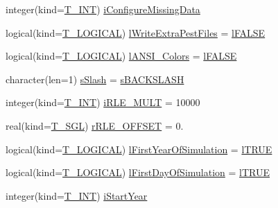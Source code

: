 \begin{DoxyCompactItemize}
\item 
integer(kind=\hyperlink{namespacetypes_a4e4d040a4425196c4d43be63e7e6103a}{T\_\-INT}) \hyperlink{typetypes_1_1_t___m_o_d_e_l___c_o_n_f_i_g_u_r_a_t_i_o_n_a1d05af921e3ca39179370f17f3836143}{iConfigureMissingData}
\item 
logical(kind=\hyperlink{namespacetypes_adfa8f4f6096bb7bdbb93f36b911dcaad}{T\_\-LOGICAL}) \hyperlink{typetypes_1_1_t___m_o_d_e_l___c_o_n_f_i_g_u_r_a_t_i_o_n_a213657df8f8f480677cb2fd9b803f51f}{lWriteExtraPestFiles} = \hyperlink{namespacetypes_ad09a27b431e0fad201524039e6943e5b}{lFALSE}
\item 
logical(kind=\hyperlink{namespacetypes_adfa8f4f6096bb7bdbb93f36b911dcaad}{T\_\-LOGICAL}) \hyperlink{typetypes_1_1_t___m_o_d_e_l___c_o_n_f_i_g_u_r_a_t_i_o_n_af2275fb1449a5289ec011bd40950abd4}{lANSI\_\-Colors} = \hyperlink{namespacetypes_ad09a27b431e0fad201524039e6943e5b}{lFALSE}
\item 
character(len=1) \hyperlink{typetypes_1_1_t___m_o_d_e_l___c_o_n_f_i_g_u_r_a_t_i_o_n_a5509f4ea7a22c6cf4f3058b9b8947531}{sSlash} = \hyperlink{namespacetypes_a7ac07dde59c21f645da2f523cc34afe1}{sBACKSLASH}
\item 
integer(kind=\hyperlink{namespacetypes_a4e4d040a4425196c4d43be63e7e6103a}{T\_\-INT}) \hyperlink{typetypes_1_1_t___m_o_d_e_l___c_o_n_f_i_g_u_r_a_t_i_o_n_a1d1fab7835ef881f626d8ac98b1f0288}{iRLE\_\-MULT} = 10000
\item 
real(kind=\hyperlink{namespacetypes_af3012489af4c138f271f1bce244b7e51}{T\_\-SGL}) \hyperlink{typetypes_1_1_t___m_o_d_e_l___c_o_n_f_i_g_u_r_a_t_i_o_n_ab6e623ffe3835e9729a518f410ce74b0}{rRLE\_\-OFFSET} = 0.
\item 
logical(kind=\hyperlink{namespacetypes_adfa8f4f6096bb7bdbb93f36b911dcaad}{T\_\-LOGICAL}) \hyperlink{typetypes_1_1_t___m_o_d_e_l___c_o_n_f_i_g_u_r_a_t_i_o_n_a7f6848b9bf415dbd66f9b955d0d3efa0}{lFirstYearOfSimulation} = \hyperlink{namespacetypes_a440f71bd0dd529ae3aaa8309171baa67}{lTRUE}
\item 
logical(kind=\hyperlink{namespacetypes_adfa8f4f6096bb7bdbb93f36b911dcaad}{T\_\-LOGICAL}) \hyperlink{typetypes_1_1_t___m_o_d_e_l___c_o_n_f_i_g_u_r_a_t_i_o_n_a3805cad83771c4cd33145715c801a203}{lFirstDayOfSimulation} = \hyperlink{namespacetypes_a440f71bd0dd529ae3aaa8309171baa67}{lTRUE}
\item 
integer(kind=\hyperlink{namespacetypes_a4e4d040a4425196c4d43be63e7e6103a}{T\_\-INT}) \hyperlink{typetypes_1_1_t___m_o_d_e_l___c_o_n_f_i_g_u_r_a_t_i_o_n_a00ba8d8dab6e3bacd575639bc18edc48}{iStartYear}
\item 

\end{DoxyCompactItemize}
